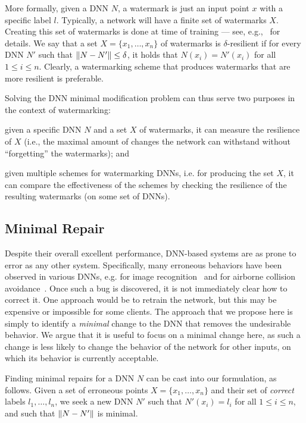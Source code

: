 \documentclass{easychair}
\begin{document}
More formally, given a DNN $N$, a watermark is just an input point $x$
with a specific label $l$. Typically, a network will have a finite set of
watermarks $X$. Creating this set of watermarks is done at time of
training --- see, e.g.,~\cite{AdBaPiKeWatermarking} for details. We
say that a set $X=\{x_1,\ldots,x_n\}$ of watermarks is $\delta$-resilient if for every
DNN $N'$ such that $\left\lVert N-N'\right\rVert\leq \delta$, it holds that
$N(x_i)=N'(x_i)$ for all $1\leq i \leq n$. Clearly, a watermarking
scheme that produces watermarks that are more resilient is preferable.

Solving the DNN minimal modification problem can thus serve two
purposes in the context of watermarking:
\begin{inparaenum}[(i)]
  \item given a specific DNN $N$ and a set $X$ of watermarks, it can
    measure the resilience of $X$ (i.e., the maximal amount of changes
    the network can withstand without ``forgetting'' the watermarks);
    and
  \item given multiple schemes for watermarking DNNs, i.e. for
    producing the set $X$, it can compare the effectiveness of the
    schemes by checking the resilience of the resulting watermarks
    (on some set of DNNs).
\end{inparaenum}
  
\subsection{Minimal Repair}
Despite their overall excellent performance, DNN-based systems are as
prone to error as any other system. Specifically, many erroneous
behaviors have been observed in various DNNs, e.g. for image
recognition~\cite{EyEvFeLiRaXiPrKo18,SzZaSuBrErGoFe13} and for airborne collision
avoidance~\cite{JuLoBrOwKo16,KaBaDiJuKo17Reluplex}. Once such a bug is
discovered, it is not immediately clear how to correct it. One
approach would be to retrain the network, but this may be expensive
or impossible for some clients. The approach that we propose here is
simply to identify a \emph{minimal} change to the DNN that removes the
undesirable behavior. We argue that it is useful to focus on a minimal
change here, as such a change is less likely to change the behavior of
the network for other inputs, on which its behavior is currently acceptable.

Finding minimal repairs for a DNN $N$ can be cast into our
formulation, as follows. Given a set of erroneous points
$X=\{x_1,\ldots,x_n\}$ and their set of \emph{correct} labels
$l_1,\ldots,l_n$, we seek a new DNN $N'$ such that $N'(x_i)=l_i$ for
all $1\leq i \leq n$, and such that 
 $\left\lVert N-N'\right\rVert$ is minimal. 
\end{document}
